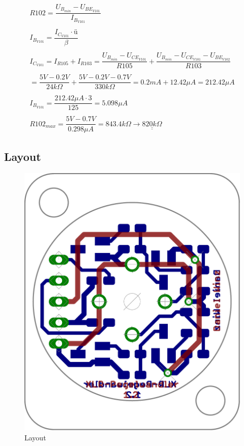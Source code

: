 %
\[ \begin{array}{l}
R102 
= \dfrac{U_{B_{min}} - U_{BE_{V101}}}{I_{B_{V101}}}\\\\
I_{B_{V101}} 
= \dfrac{I_{C_{V101}} \cdot ü}{\beta}\\\\
I_{C_{V101}} 
= I_{R105} + I_{R103} 
= \dfrac{U_{B_{min}} - U_{CE_{V101}}}{R105} + \dfrac{U_{B_{min}} - U_{CE_{V101}} - U_{BE_{V102}}}{R103} \\\\
= \dfrac{5 V - 0.2 V}{24 k \Omega} + \dfrac{5 V - 0.2 V - 0.7 V}{330 k \Omega} 
= 0.2 mA + 12.42 \mu A 
= 212.42 \mu A \\\\
I_{B_{V101}} 
= \dfrac{212.42 \mu A \cdot 3}{125} 
= 5.098 \mu A \\\\
R102_{max} 
= \dfrac{5 V - 0.7 V}{0.298 \mu A} 
= 843.4 k \Omega 
\rightarrow \underline{\underline{820 k \Omega}}
\end{array} \]

\subsection{Layout}

\begin{figure}[h!]
	\centering
	\includegraphics[scale=\layscale]{fig/xlr_pegelwandler_v_1_2_lay_transp.pdf}
	\caption{Layout}
	\label{lay:pegw}
\end{figure}
